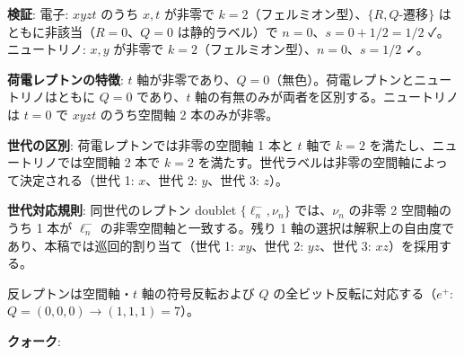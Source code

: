 \documentclass[
  a4paper,11pt]{ltjsarticle}
\theoremstyle{definition}
\theoremstyle{remark}
\begin{document}
\textbf{検証}: 電子: \(xyzt\) のうち \(x, t\) が非零で
\(k = 2\)（フェルミオン型）、\(\{R, Q\text{-遷移}\}\)
はともに非該当（\(R = 0\)、\(Q = 0\) は静的ラベル）で
\(n = 0\)、\(s = 0 + 1/2 = 1/2\) ✓。ニュートリノ: \(x, y\) が非零で
\(k = 2\)（フェルミオン型）、\(n = 0\)、\(s = 1/2\) ✓。

\textbf{荷電レプトンの特徴}: \(t\)
軸が非零であり、\(Q = 0\)（無色）。荷電レプトンとニュートリノはともに
\(Q = 0\) であり、\(t\) 軸の有無のみが両者を区別する。ニュートリノは
\(t = 0\) で \(xyzt\) のうち空間軸 2 本のみが非零。

\textbf{世代の区別}: 荷電レプトンでは非零の空間軸 1 本と \(t\) 軸で
\(k = 2\) を満たし、ニュートリノでは空間軸 2 本で \(k = 2\)
を満たす。世代ラベルは非零の空間軸によって決定される（世代 1:
\(x\)、世代 2: \(y\)、世代 3: \(z\)）。

\textbf{世代対応規則}: 同世代のレプトン doublet \(\{\ell^-_n, \nu_n\}\)
では、\(\nu_n\) の非零 2 空間軸のうち 1 本が \(\ell^-_n\)
の非零空間軸と一致する。残り 1
軸の選択は解釈上の自由度であり、本稿では巡回的割り当て（世代 1:
\(xy\)、世代 2: \(yz\)、世代 3: \(xz\)）を採用する。

反レプトンは空間軸・\(t\) 軸の符号反転および \(Q\)
の全ビット反転に対応する（\(e^+\): \(Q = (0,0,0) \to (1,1,1) = 7\)）。

\textbf{クォーク}:
\end{document}
